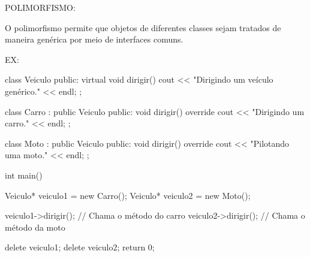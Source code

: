 POLIMORFISMO:

O polimorfismo permite que objetos de diferentes classes sejam tratados de maneira 
genérica por meio de interfaces comuns.

EX:

class Veiculo {
public:
    virtual void dirigir() {
        cout << "Dirigindo um veículo genérico." << endl;
    }
};

class Carro : public Veiculo {
public:
    void dirigir() override {
        cout << "Dirigindo um carro." << endl;
    }
};

class Moto : public Veiculo {
public:
    void dirigir() override {
        cout << "Pilotando uma moto." << endl;
    }
};

int main() {
    Veiculo* veiculo1 = new Carro();
    Veiculo* veiculo2 = new Moto();

    veiculo1->dirigir();  // Chama o método do carro
    veiculo2->dirigir();  // Chama o método da moto

    delete veiculo1;
    delete veiculo2;
    return 0;
}
